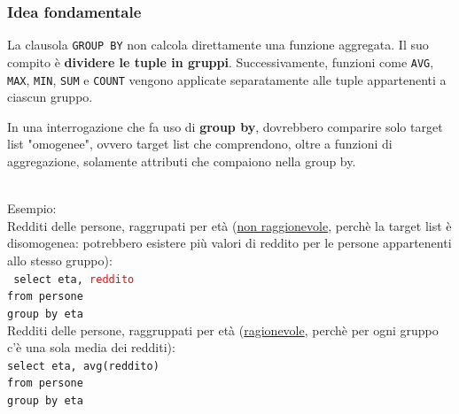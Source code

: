 \subsubsection{Idea fondamentale}
La clausola \texttt{GROUP BY} non calcola direttamente una funzione
aggregata.
Il suo compito è \textbf{dividere le tuple in gruppi}.
Successivamente, funzioni come \texttt{AVG}, \texttt{MAX},
\texttt{MIN}, \texttt{SUM} e \texttt{COUNT} vengono applicate
separatamente alle tuple appartenenti a ciascun gruppo.\medskip\\
\colorbox{SALZO}{\parbox{\dimexpr\linewidth-2\fboxsep}{\begin{regola}
In una interrogazione che fa uso di \textbf{group by}, dovrebbero comparire solo target list "omogenee", ovvero target list che comprendono, oltre a funzioni di aggregazione, solamente attributi
che compaiono nella group by.\end{regola}}}\medskip\\
\textcolor{verdeEsempio}{Esempio:}\\
Redditi delle persone, raggrupati per età (\underline{non raggionevole}, perchè la target list è disomogenea: potrebbero esistere più valori di reddito per le persone appartenenti allo stesso gruppo):\\
\texttt{ select \textcolor{verdeScuro}{eta}, \textcolor{red}{reddito}\\
from persone\\
group by \textcolor{verdeScuro}{eta}}\\
Redditi delle persone, raggruppati per età (\underline{ragionevole}, perchè per ogni gruppo c'è una sola media dei redditi):\\
\texttt{select \textcolor{verdeScuro}{eta}, \textcolor{verdeScuro}{avg}(reddito)\\
from persone\\
group by \textcolor{verdeScuro}{eta}}

